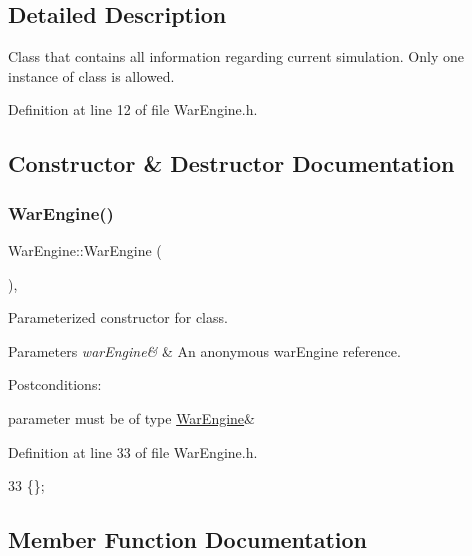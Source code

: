 \subsection{Detailed Description}
Class that contains all information regarding current simulation. Only one instance of class is allowed. 

Definition at line 12 of file War\+Engine.\+h.



\subsection{Constructor \& Destructor Documentation}
\mbox{\label{classWarEngine_a76af9e002be42642841c863b9d0ab710}} 
\subsubsection{\texorpdfstring{War\+Engine()}{WarEngine()}}
{\footnotesize\ttfamily War\+Engine\+::\+War\+Engine (\begin{DoxyParamCaption}\item[{const \hyperlink{classWarEngine}{War\+Engine} \&}]{ }\end{DoxyParamCaption})\hspace{0.3cm}{\ttfamily [inline]}, {\ttfamily [protected]}}



Parameterized constructor for class. 


\begin{DoxyParams}{Parameters}
{\em war\+Engine\&} & An anonymous war\+Engine reference.\\
\hline
\end{DoxyParams}
Postconditions\+:
\begin{DoxyItemize}
\item parameter must be of type \hyperlink{classWarEngine}{War\+Engine}\& 
\end{DoxyItemize}

Definition at line 33 of file War\+Engine.\+h.


\begin{DoxyCode}
33 \{\};
\end{DoxyCode}


\subsection{Member Function Documentation}
\mbox{\label{classWarEngine_aa8219fbd385bb54ad0363257915fe986}} 
